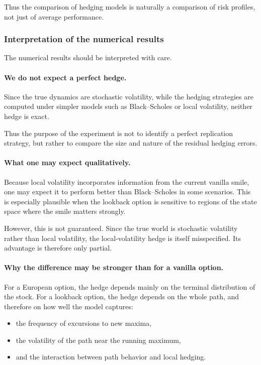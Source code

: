 \documentclass[11pt]{article}
\theoremstyle{plain}
\theoremstyle{definition}
\theoremstyle{remark}
\begin{document}
Thus the comparison of hedging models is naturally a comparison of risk
profiles, not just of average performance.

\subsubsection{Interpretation of the numerical results}

The numerical results should be interpreted with care.

\paragraph{We do not expect a perfect hedge.}
Since the true dynamics are stochastic volatility, while the hedging
strategies are computed under simpler models such as Black--Scholes or
local volatility, neither hedge is exact.

Thus the purpose of the experiment is not to identify a perfect
replication strategy, but rather to compare the size and nature of the
residual hedging errors.

\paragraph{What one may expect qualitatively.}
Because local volatility incorporates information from the current
vanilla smile, one may expect it to perform better than Black--Scholes
in some scenarios.
This is especially plausible when the lookback option is sensitive to
regions of the state space where the smile matters strongly.

However, this is not guaranteed.
Since the true world is stochastic volatility rather than local
volatility, the local-volatility hedge is itself misspecified.
Its advantage is therefore only partial.

\paragraph{Why the difference may be stronger than for a vanilla option.}
For a European option, the hedge depends mainly on the terminal
distribution of the stock.
For a lookback option, the hedge depends on the whole path, and therefore
on how well the model captures:
\begin{itemize}[leftmargin=1.4em]
    \item the frequency of excursions to new maxima,
    \item the volatility of the path near the running maximum,
    \item and the interaction between path behavior and local hedging.
\end{itemize}
\end{document}
